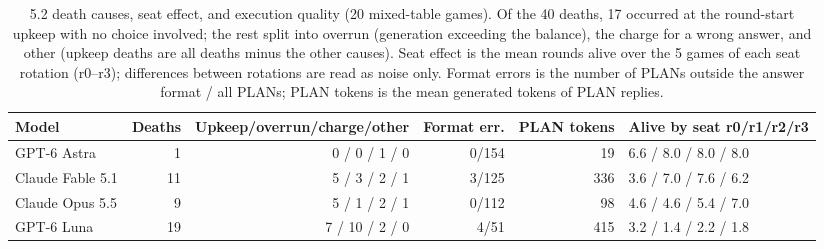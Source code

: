 \begin{table}[H]
\centering\scriptsize
\setlength{\tabcolsep}{2.5pt}
\caption{5.2 death causes, seat effect, and execution quality (20 mixed-table games). Of the 40 deaths, 17 occurred at the round-start upkeep with no choice involved; the rest split into overrun (generation exceeding the balance), the charge for a wrong answer, and other (upkeep deaths are all deaths minus the other causes). Seat effect is the mean rounds alive over the 5 games of each seat rotation (r0--r3); differences between rotations are read as noise only. Format errors is the number of PLANs outside the answer format / all PLANs; PLAN tokens is the mean generated tokens of PLAN replies.}
\label{tab:arena-misc}
\begin{tabular}{@{}lrrrrl@{}}
\toprule
Model & Deaths & Upkeep/overrun/charge/other & Format err. & PLAN tokens & Alive by seat r0/r1/r2/r3 \\
\midrule
GPT-6 Astra & 1 & 0 / 0 / 1 / 0 & 0/154 & 19 & 6.6 / 8.0 / 8.0 / 8.0 \\
Claude Fable 5.1 & 11 & 5 / 3 / 2 / 1 & 3/125 & 336 & 3.6 / 7.0 / 7.6 / 6.2 \\
Claude Opus 5.5 & 9 & 5 / 1 / 2 / 1 & 0/112 & 98 & 4.6 / 4.6 / 5.4 / 7.0 \\
GPT-6 Luna & 19 & 7 / 10 / 2 / 0 & 4/51 & 415 & 3.2 / 1.4 / 2.2 / 1.8 \\
\bottomrule
\end{tabular}
\end{table}
